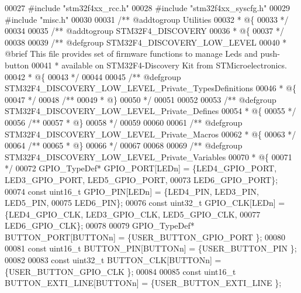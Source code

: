 \begin{DoxyCode}
00027 \textcolor{preprocessor}{#}\textcolor{preprocessor}{include} "stm32f4xx_rcc.h"
00028 \textcolor{preprocessor}{#}\textcolor{preprocessor}{include} "stm32f4xx_syscfg.h"
00029 \textcolor{preprocessor}{#}\textcolor{preprocessor}{include} "misc.h"
00030 
00031 \textcolor{comment}{/** @addtogroup Utilities}
00032 \textcolor{comment}{  * @\{}
00033 \textcolor{comment}{  */}
00034 
00035 \textcolor{comment}{/** @addtogroup STM32F4\_DISCOVERY}
00036 \textcolor{comment}{  * @\{}
00037 \textcolor{comment}{  */}
00038 
00039 \textcolor{comment}{/** @defgroup STM32F4\_DISCOVERY\_LOW\_LEVEL }
00040 \textcolor{comment}{  * @brief This file provides set of firmware functions to manage Leds and push-button}
00041 \textcolor{comment}{  *        available on STM32F4-Discovery Kit from STMicroelectronics.}
00042 \textcolor{comment}{  * @\{}
00043 \textcolor{comment}{  */}
00044 
00045 \textcolor{comment}{/** @defgroup STM32F4\_DISCOVERY\_LOW\_LEVEL\_Private\_TypesDefinitions}
00046 \textcolor{comment}{  * @\{}
00047 \textcolor{comment}{  */}
00048 \textcolor{comment}{/**}
00049 \textcolor{comment}{  * @\}}
00050 \textcolor{comment}{  */}
00051 
00052 
00053 \textcolor{comment}{/** @defgroup STM32F4\_DISCOVERY\_LOW\_LEVEL\_Private\_Defines}
00054 \textcolor{comment}{  * @\{}
00055 \textcolor{comment}{  */}
00056 \textcolor{comment}{/**}
00057 \textcolor{comment}{  * @\}}
00058 \textcolor{comment}{  */}
00059 
00060 
00061 \textcolor{comment}{/** @defgroup STM32F4\_DISCOVERY\_LOW\_LEVEL\_Private\_Macros}
00062 \textcolor{comment}{  * @\{}
00063 \textcolor{comment}{  */}
00064 \textcolor{comment}{/**}
00065 \textcolor{comment}{  * @\}}
00066 \textcolor{comment}{  */}
00067 
00068 
00069 \textcolor{comment}{/** @defgroup STM32F4\_DISCOVERY\_LOW\_LEVEL\_Private\_Variables}
00070 \textcolor{comment}{  * @\{}
00071 \textcolor{comment}{  */}
00072 GPIO\_TypeDef* GPIO_PORT[LEDn] = \{LED4_GPIO_PORT, LED3_GPIO_PORT, 
      LED5_GPIO_PORT,
00073                                  LED6_GPIO_PORT\};
00074 \textcolor{keyword}{const} uint16\_t GPIO_PIN[LEDn] = \{LED4_PIN, LED3_PIN, LED5_PIN,
00075                                  LED6_PIN\};
00076 \textcolor{keyword}{const} uint32\_t GPIO_CLK[LEDn] = \{LED4_GPIO_CLK, LED3_GPIO_CLK, 
      LED5_GPIO_CLK,
00077                                  LED6_GPIO_CLK\};
00078 
00079 GPIO\_TypeDef* BUTTON_PORT[BUTTONn] = \{USER_BUTTON_GPIO_PORT \};
00080 
00081 \textcolor{keyword}{const} uint16\_t BUTTON_PIN[BUTTONn] = \{USER_BUTTON_PIN \};
00082 
00083 \textcolor{keyword}{const} uint32\_t BUTTON_CLK[BUTTONn] = \{USER_BUTTON_GPIO_CLK \};
00084 
00085 \textcolor{keyword}{const} uint16\_t BUTTON_EXTI_LINE[BUTTONn] = \{USER_BUTTON_EXTI_LINE \};

\end{DoxyCode}
